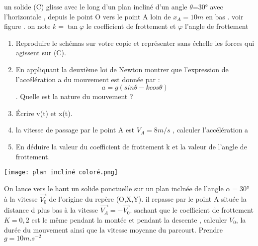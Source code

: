 \documentclass[10pt,a4paper]{article}
\begin{document}
\begin{tcolorbox}[sabour,title=EXERCICE 16]

un solide (C) glisse avec le long d'un plan incliné d'un angle $\theta$=30\.° avec l'horizontale , depuis le point O vers le point A loin de $x_A=10m$ en bas . voir figure . on note $ k=\tan \varphi$  le coefficient de frottement  et $\varphi$ l'angle de frottement 
 \begin{enumerate}
 \item  Reproduire le schémas sur votre copie et représenter sans échelle les forces qui agissent sur (C).

 \item En  appliquant  la deuxième loi de Newton montrer que l'expression de  l'accélération a du mouvement est donnée par : 
 $$ a= g (sin\theta - kcos\theta)$$ . Quelle est la nature du mouvement ? 

 \item Écrire v(t) et x(t). 
  \item  la vitesse de passage par le point A est $V_A=8m/s$ , calculer l'accélération a   
\item En déduire la valeur du coefficient de frottement k et la valeur de l'angle de frottement.

\end{enumerate}
\begin{center}
\texttt{[image: plan incliné coloré.png]} 
\end{center}
\end{tcolorbox}
\begin{tcolorbox}[sabour,title=EXERCICE 17]

On lance vers le haut un solide ponctuelle sur un plan inclnée de l'angle $\alpha=$30° à la vitesse $\vec{V_0}$ de l'origine du repère (O,X,Y). il repasse par le point A située la distance d plus bas à la vitesse $\vec{V_A}= - \vec{V_0} $. sachant que le coefficient de frottement $K=0,2$ est le même pendant la montée et pendant la descente , calculer $V_0$, la durée du mouvement ainsi que la vitesse moyenne du parcourt. Prendre $g=10m.s^{-2}$
\end{tcolorbox}
\end{document}
